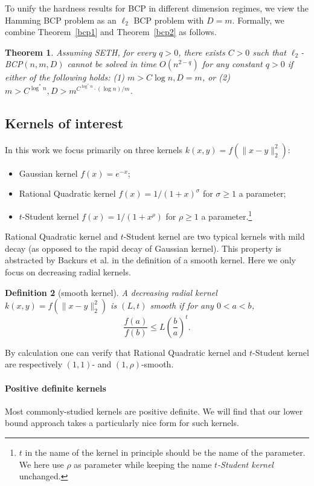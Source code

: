 \documentclass[10pt,a4paper]{article}
\newtheorem{theorem}{Theorem}
\newtheorem{definition}[theorem]{Definition}
\theoremstyle{remark}
\numberwithin{equation}{section}
\numberwithin{theorem}{section}
\begin{document}
To unify the hardness results for BCP in different dimension regimes, we view the Hamming BCP problem 
as an $\ell_2$ BCP problem with $D = m$. 
Formally, we combine Theorem~\ref{bcp1} and Theorem~\ref{bcp2} as follows.
\begin{theorem} \label{thm:mainbcp}
Assuming SETH, for every $q > 0$, there exists $C > 0$ such that $\ell_2$\emph{\textsf{-BCP}}$(n, m, D)$
cannot be solved in time $O(n^{2-q})$ for any constant $q>0$ if either of the following holds: (1) $m > C \log n, D = m$, or (2) $m > C^{\log^* n}, D > m^{C^{\log^* n} \cdot (\log n)/m}$.
\end{theorem}

\subsection{Kernels of interest}
In this work we focus primarily on three kernels $k(x, y) = f(\|x - y\|_2^2)$:
\begin{itemize}
\item Gaussian kernel $f(x) = e^{-x}$;
\item Rational Quadratic kernel $f(x) = 1/(1+x)^\sigma$ for $\sigma \ge 1$ a parameter;
\item $t$-Student kernel $f(x) = 1/(1+x^{\rho})$ for $\rho \ge 1$ a parameter.\footnote{$t$ in the name of the kernel in principle should be the name of the parameter. We here use $\rho$ as parameter while keeping the name \emph{$t$-Student kernel} unchanged.}
\end{itemize}
Rational Quadratic kernel and $t$-Student kernel are two typical kernels with mild decay (as opposed to the rapid decay of Gaussian kernel). This property is abstracted by Backurs et al. \cite{BCIS18} in the definition of a smooth kernel. Here we only focus on decreasing radial kernels.
\begin{definition}[smooth kernel]
A decreasing radial kernel $k(x, y) = f(\|x - y\|_2^2)$ is $(L, t)$ smooth if for any $0 < a < b$,
\[\frac{f(a)}{f(b)} \le L \left(\frac ba \right)^t.\]
\end{definition}
By calculation one can verify that Rational Quadratic kernel and $t$-Student kernel are respectively $(1, 1)$- and $(1, \rho)$-smooth.

\paragraph{Positive definite kernels}
Most commonly-studied kernels are positive definite. We will find that our lower bound approach takes a particularly nice form for such kernels.
\end{document}
